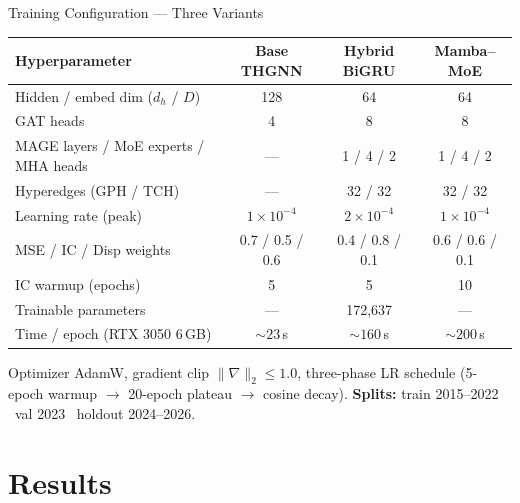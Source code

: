 \documentclass[aspectratio=169, 10pt]{beamer}
\begin{document}
\begin{frame}{Training Configuration — Three Variants}
  \centering
  \renewcommand{\arraystretch}{1.18}
  \footnotesize
  \begin{tabular}{lccc}
    \toprule
    \textbf{Hyperparameter} & \textbf{Base THGNN} & \textbf{Hybrid BiGRU} & \textbf{Mamba--MoE} \\
    \midrule
    Hidden / embed dim ($d_h$ / $D$) & 128 & 64 & 64 \\
    GAT heads                        & 4   & 8  & 8 \\
    MAGE layers / MoE experts / MHA heads & --- & 1 / 4 / 2 & 1 / 4 / 2 \\
    Hyperedges (GPH / TCH)           & --- & 32 / 32 & 32 / 32 \\
    Learning rate (peak)             & $1{\times}10^{-4}$ & $2{\times}10^{-4}$ & $1{\times}10^{-4}$ \\
    MSE / IC / Disp weights          & 0.7 / 0.5 / 0.6 & 0.4 / 0.8 / 0.1 & 0.6 / 0.6 / 0.1 \\
    IC warmup (epochs)               & 5 & 5 & 10 \\
    \midrule
    Trainable parameters             & --- & 172{,}637 & --- \\
    Time / epoch (RTX 3050 6\,GB)    & ${\sim}23$\,s & ${\sim}160$\,s & ${\sim}200$\,s \\
    \bottomrule
  \end{tabular}

  \vspace{0.3cm}
  \footnotesize
  Optimizer AdamW, gradient clip $\|\nabla\|_2{\le}1.0$, three-phase LR schedule
  (5-epoch warmup $\rightarrow$ 20-epoch plateau $\rightarrow$ cosine decay).
  \textbf{Splits:} train 2015--2022 \textbar\ val 2023 \textbar\ holdout 2024--2026.
\end{frame}

\section{Results}
\end{document}
